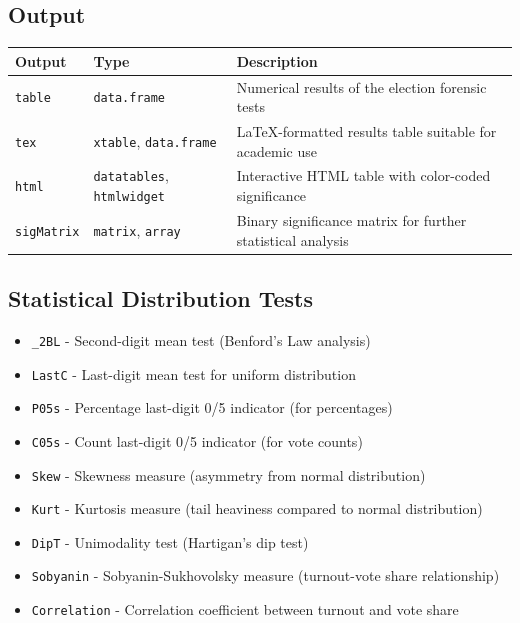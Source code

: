 \documentclass{article}
\begin{document}
\subsection{Output}
\begin{longtable}{p{3cm}p{3cm}p{8cm}}
\toprule
\textbf{Output} & \textbf{Type} & \textbf{Description} \\
\midrule
\texttt{table} & \texttt{data.frame} & Numerical results of the election forensic tests \\
\texttt{tex} & \texttt{xtable}, \texttt{data.frame} & LaTeX-formatted results table suitable for academic use \\
\texttt{html} & \texttt{datatables}, \texttt{htmlwidget} & Interactive HTML table with color-coded significance \\
\texttt{sigMatrix} & \texttt{matrix}, \texttt{array} & Binary significance matrix for further statistical analysis \\
\bottomrule
\end{longtable}

\subsection{Statistical Distribution Tests}
\begin{itemize}
    \item \texttt{\_2BL} - Second-digit mean test (Benford's Law analysis)
    \item \texttt{LastC} - Last-digit mean test for uniform distribution
    \item \texttt{P05s} - Percentage last-digit 0/5 indicator (for percentages)
    \item \texttt{C05s} - Count last-digit 0/5 indicator (for vote counts)
    \item \texttt{Skew} - Skewness measure (asymmetry from normal distribution)
    \item \texttt{Kurt} - Kurtosis measure (tail heaviness compared to normal distribution)
    \item \texttt{DipT} - Unimodality test (Hartigan's dip test)
    \item \texttt{Sobyanin} - Sobyanin-Sukhovolsky measure (turnout-vote share relationship)
    \item \texttt{Correlation} - Correlation coefficient between turnout and vote share
\end{itemize}
\end{document}
